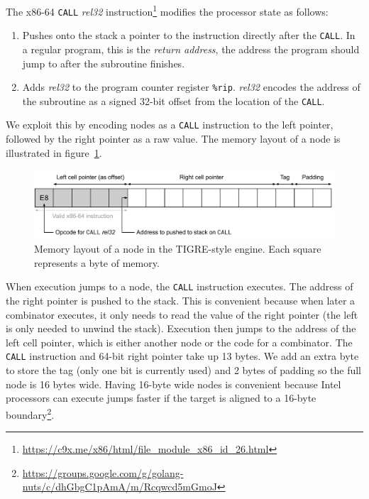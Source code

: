 \documentclass[conference]{IEEEtran}
\begin{document}
The x86-64 \texttt{CALL} \textit{rel32} instruction\footnote{\url{https://c9x.me/x86/html/file_module_x86_id_26.html}} modifies the processor state as follows:
\begin{enumerate}
    \item Pushes onto the stack a pointer to the instruction directly after the \texttt{CALL}.
          In a regular program, this is the \emph{return address}, the address the program should jump to after the subroutine finishes.
    \item Adds \textit{rel32} to the program counter register \texttt{\%rip}.
          \textit{rel32} encodes the address of the subroutine as a signed 32-bit offset from the location of the \texttt{CALL}.
\end{enumerate}

We exploit this by encoding nodes as a \texttt{CALL} instruction to the left pointer, followed by the right pointer as a raw value.
The memory layout of a node is illustrated in figure~\ref{fig:tigre_layout}.

\begin{figure}
    \includegraphics[width=2\columnwidth]{tigre_layout}
    \centering
    \caption{
        Memory layout of a node in the TIGRE-style engine.
        Each square represents a byte of memory.
    }
    \label{fig:tigre_layout}
\end{figure}

When execution jumps to a node, the \texttt{CALL} instruction executes.
The address of the right pointer is pushed to the stack.
This is convenient because when later a combinator executes, it only needs to read the value of the right pointer (the left is only needed to unwind the stack).
Execution then jumps to the address of the left cell pointer, which is either another node or the code for a combinator.
The \texttt{CALL} instruction and 64-bit right pointer take up 13 bytes.
We add an extra byte to store the tag (only one bit is currently used) and 2 bytes of padding so the full node is 16 bytes wide.
Having 16-byte wide nodes is convenient because Intel processors can execute jumps faster if the target is aligned to a 16-byte boundary\footnote{\url{https://groups.google.com/g/golang-nuts/c/dhGbgC1pAmA/m/Rcqwcd5mGmoJ}}.
\end{document}
